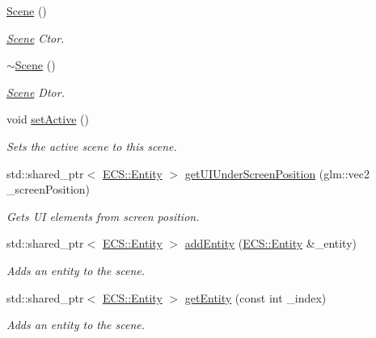 \begin{DoxyCompactItemize}
\item 
\hyperlink{class_cookie_eng_1_1_scene_1_1_scene_a957b1da74150da2df341c1ff7ed39613}{Scene} ()
\begin{DoxyCompactList}\small\item\em \hyperlink{class_cookie_eng_1_1_scene_1_1_scene}{Scene} Ctor. \end{DoxyCompactList}\item 
\hyperlink{class_cookie_eng_1_1_scene_1_1_scene_a2aaed9f1b869d7c35b9d3fada5bf198a}{$\sim$\+Scene} ()
\begin{DoxyCompactList}\small\item\em \hyperlink{class_cookie_eng_1_1_scene_1_1_scene}{Scene} Dtor. \end{DoxyCompactList}\item 
void \hyperlink{class_cookie_eng_1_1_scene_1_1_scene_adca281b1bff287a62391b5bb8bc18f5c}{set\+Active} ()
\begin{DoxyCompactList}\small\item\em Sets the active scene to this scene. \end{DoxyCompactList}\item 
std\+::shared\+\_\+ptr$<$ \hyperlink{class_cookie_eng_1_1_e_c_s_1_1_entity}{E\+C\+S\+::\+Entity} $>$ \hyperlink{class_cookie_eng_1_1_scene_1_1_scene_af8468e3788c5f9a8696aa4deac8c62a3}{get\+U\+I\+Under\+Screen\+Position} (glm\+::vec2 \+\_\+screen\+Position)
\begin{DoxyCompactList}\small\item\em Gets UI elements from screen position. \end{DoxyCompactList}\item 
std\+::shared\+\_\+ptr$<$ \hyperlink{class_cookie_eng_1_1_e_c_s_1_1_entity}{E\+C\+S\+::\+Entity} $>$ \hyperlink{class_cookie_eng_1_1_scene_1_1_scene_a2cccad4cc0411852e327b249b12b9bc3}{add\+Entity} (\hyperlink{class_cookie_eng_1_1_e_c_s_1_1_entity}{E\+C\+S\+::\+Entity} \&\+\_\+entity)
\begin{DoxyCompactList}\small\item\em Adds an entity to the scene. \end{DoxyCompactList}\item 
std\+::shared\+\_\+ptr$<$ \hyperlink{class_cookie_eng_1_1_e_c_s_1_1_entity}{E\+C\+S\+::\+Entity} $>$ \hyperlink{class_cookie_eng_1_1_scene_1_1_scene_a4287243abfe6016c8c819aebc090bf4c}{get\+Entity} (const int \+\_\+index)
\begin{DoxyCompactList}\small\item\em Adds an entity to the scene. \end{DoxyCompactList}\item 

\end{DoxyCompactItemize}
